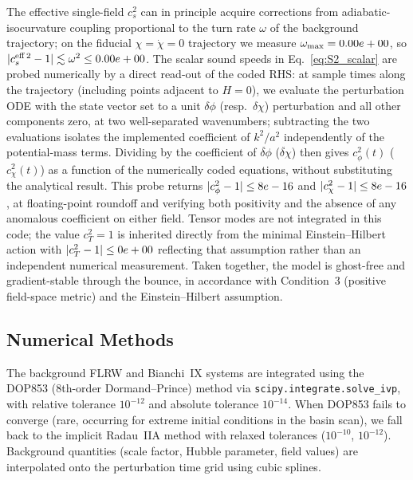 \documentclass[11pt,a4paper]{article}
\begin{document}
The effective single-field $c_s^2$ can in principle acquire corrections from adiabatic-isocurvature coupling proportional to the turn rate $\omega$ of the background trajectory; on the fiducial $\chi = \dot\chi = 0$ trajectory we measure $\omega_{\max} = 0.00e+00$, so $|c_s^{\rm eff\,2} - 1| \lesssim \omega^2 \leq 0.00e+00$.  The scalar sound speeds in Eq.~\eqref{eq:S2_scalar} are probed numerically by a direct read-out of the coded RHS: at \cSProbeCount{} sample times along the trajectory (including points adjacent to $H = 0$), we evaluate the perturbation ODE with the state vector set to a unit $\delta\phi$ (resp.~$\delta\chi$) perturbation and all other components zero, at two well-separated wavenumbers; subtracting the two evaluations isolates the implemented coefficient of $k^2/a^2$ independently of the potential-mass terms.  Dividing by the coefficient of $\ddot{\delta\phi}$ ($\ddot{\delta\chi}$) then gives $c_\phi^2(t)$ ($c_\chi^2(t)$) as a function of the numerically coded equations, without substituting the analytical result.  This probe returns $|c_\phi^2 - 1| \leq 8e-16$ and $|c_\chi^2 - 1| \leq 8e-16$, at floating-point roundoff and verifying both positivity and the absence of any anomalous coefficient on either field.  Tensor modes are not integrated in this code; the value $c_T^2 = 1$ is inherited directly from the minimal Einstein--Hilbert action with $|c_T^2 - 1| \leq 0e+00$ reflecting that assumption rather than an independent numerical measurement.  Taken together, the model is ghost-free and gradient-stable through the bounce, in accordance with Condition~3 (positive field-space metric) and the Einstein--Hilbert assumption.

\subsection{Numerical Methods}

The background FLRW and Bianchi~IX systems are integrated using the DOP853 (8th-order Dormand--Prince) method via \texttt{scipy.integrate.solve\_ivp}, with relative tolerance $10^{-12}$ and absolute tolerance $10^{-14}$. When DOP853 fails to converge (rare, occurring for extreme initial conditions in the basin scan), we fall back to the implicit Radau~IIA method with relaxed tolerances ($10^{-10}$, $10^{-12}$). Background quantities (scale factor, Hubble parameter, field values) are interpolated onto the perturbation time grid using cubic splines.
\end{document}
